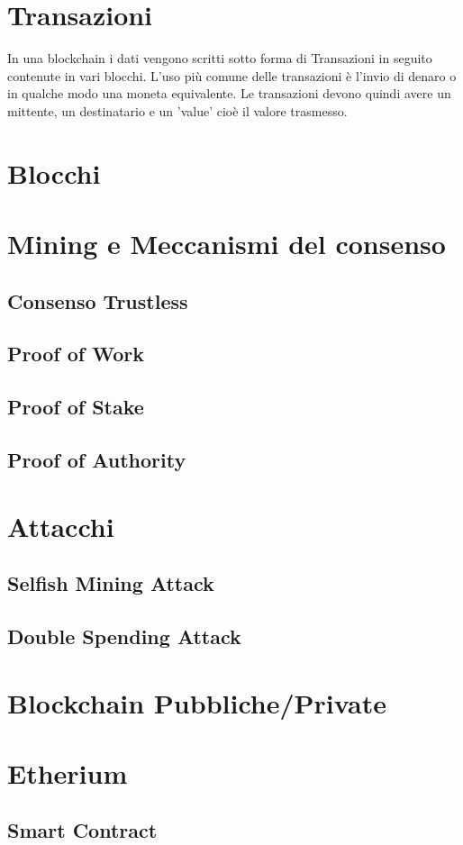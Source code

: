 \documentclass[a4paper]{report}
\begin{document}
\section{Transazioni}
In una blockchain i dati vengono scritti sotto forma di Transazioni in seguito contenute in vari blocchi. L'uso più comune delle transazioni è l'invio di denaro o in qualche modo una moneta equivalente. Le transazioni devono quindi avere un mittente, un destinatario e un 'value' cioè il valore trasmesso.
\section{Blocchi}
\section{Mining e Meccanismi del consenso}
\subsection{Consenso Trustless}
\subsection{Proof of Work}
\subsection{Proof of Stake}
\subsection{Proof of Authority}
\section{Attacchi}
\subsection{Selfish Mining Attack}
\subsection{Double Spending Attack}
\section{Blockchain Pubbliche/Private}
\section{Etherium}
\subsection{Smart Contract}
\end{document}
